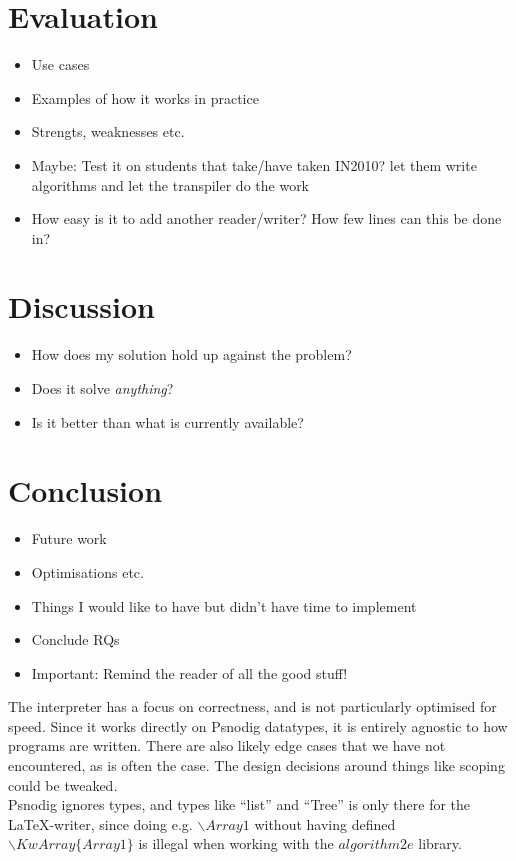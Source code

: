 \documentclass[twoside, openright, a4paper,  UKenglish]{report}
\begin{document}
\chapter{Evaluation}
\begin{itemize}
    \item Use cases
    \item Examples of how it works in practice
    \item Strengts, weaknesses etc.
    \item Maybe: Test it on students that take/have taken IN2010? let them write algorithms and let the transpiler do the work
    \item How easy is it to add another reader/writer? How few lines can this be done in?
\end{itemize}

\chapter{Discussion}
\begin{itemize}
    \item How does my solution hold up against the problem?
    \item Does it solve \textit{anything}?
    \item Is it better than what is currently available?
\end{itemize}

\chapter{Conclusion}
\begin{itemize}
    \item Future work
    \item Optimisations etc.
    \item Things I would like to have but didn't have time to implement
    \item Conclude RQs
    \item Important: Remind the reader of all the good stuff!
\end{itemize}
The interpreter has a focus on correctness, and is not particularly optimised for speed. Since it works directly on Psnodig datatypes, it is entirely agnostic to how programs are written. There are also likely edge cases that we have not encountered, as is often the case. The design decisions around things like scoping could be tweaked. \hfill \\

Psnodig ignores types, and types like ``list'' and ``Tree'' is only there for the \LaTeX-writer, since doing e.g. $\backslash Array1$ without having defined $\backslash KwArray\{Array1\}$ is illegal when working with the $algorithm2e$ library. \hfill \\
\end{document}
